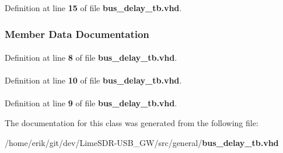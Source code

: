 Definition at line {\bf 15} of file {\bf bus\+\_\+delay\+\_\+tb.\+vhd}.



\subsubsection{Member Data Documentation}
\paragraph[{ieee}]{\hspace{0.3cm}{\ttfamily [Library]}}\label{classbusy__delay__tb_a0a6af6eef40212dbaf130d57ce711256}


Definition at line {\bf 8} of file {\bf bus\+\_\+delay\+\_\+tb.\+vhd}.

\paragraph[{numeric\+\_\+std}]{\hspace{0.3cm}{\ttfamily [Package]}}\label{classbusy__delay__tb_a2edc34402b573437d5f25fa90ba4013e}


Definition at line {\bf 10} of file {\bf bus\+\_\+delay\+\_\+tb.\+vhd}.

\paragraph[{std\+\_\+logic\+\_\+1164}]{\hspace{0.3cm}{\ttfamily [Package]}}\label{classbusy__delay__tb_acd03516902501cd1c7296a98e22c6fcb}


Definition at line {\bf 9} of file {\bf bus\+\_\+delay\+\_\+tb.\+vhd}.



The documentation for this class was generated from the following file\+:\begin{DoxyCompactItemize}
\item 
/home/erik/git/dev/\+Lime\+S\+D\+R-\/\+U\+S\+B\+\_\+\+G\+W/src/general/{\bf bus\+\_\+delay\+\_\+tb.\+vhd}\end{DoxyCompactItemize}
